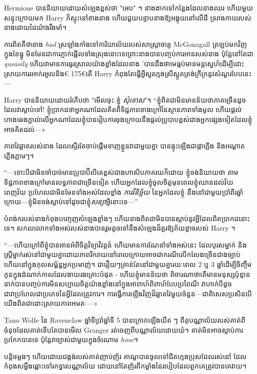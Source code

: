 {{{{{{{{Hermione បាននិយាយដោយសំឡេងខ្ពស់ថា "អេប" ។ នាងងាកទៅកន្លែងដែលនាងឈរ ហើយមួយសន្ទុះក្រោយមក Harry ក៏ស្ទុះទៅខាងនាង ហើយជួយបន្ទាបនាងឱ្យអង្គុយនៅលើដី ទ្ររាងកាយរបស់នាងដោយដៃយ៉ាងរឹងមាំ។

ការពិតគឺថានាង \emph{had} ស្រឡាំងកាំងទៅការិយាល័យរបស់សាស្រ្តាចារ្យ McGonagall ត្រឡប់មកវិញក្នុងខែធ្នូ មិនមែនជាការភ្ញាក់ផ្អើលទាំងស្រុងនោះទេព្រោះនាងបានបញ្ចប់ការអានរបស់នាង ប៉ុន្តែនៅតែជា \emph{queasily} ហើយវាមានការធូរស្រាលយ៉ាងខ្លាំងដែលនាង 'បានដឹងថាមេធ្មប់មានមន្តស្នេហ៍ដើម្បីដោះស្រាយការរអាក់រអួលនិង€ 175€{តើ Harry កំពុងតែធ្វើអ្វីសួរក្មេងស្រីស្លូតត្រង់ក្រីក្រនូវសំណួរបែបនេះ—}

Harry បាននិយាយដោយរំភើបថា "មើលចុះ ខ្ញុំ \emph{សុំទោស}"។ “ខ្ញុំ​ពិត​ជា​មិន​មាន​ន័យ​ថា​ភាគច្រើន​ដូច​ដែល​វា​ស្តាប់​ទៅ! ខ្ញុំ​ប្រាកដ​ថា​អ្នក​ណា​ដែល​គិត​ពី​ទិដ្ឋភាព​ខាងក្រៅ​នៃ​ស្ថានភាព​ទាំង​មូល ហើយ​ផ្តល់​ហាងឆេង​ភ្នាល់​លើ​អ្នក​ណា​ដែល​ខ្ញុំ​បាន​រៀបការ​ចុងក្រោយ​នឹង​ផ្តល់​ប្រូបាប​ខ្ពស់​ជាង​អ្នក​ផ្សេង​ទៀត​ដែល​ខ្ញុំ​អាច​គិត​ដល់—»

ភាពវៃឆ្លាតរបស់នាង ដែលស្ទើរតែចាប់ផ្តើមទាញខ្លួនវាជាមួយគ្នា បានផ្ទុះឡើងជាផ្កាភ្លើង និងអណ្តាតភ្លើងភ្លាមៗ។

“—ទោះបីជាមិនចាំបាច់មានប្រូបាប៊ីលីតេខ្ពស់ជាងហាសិបភាគរយក៏ដោយ ខ្ញុំចង់និយាយថា តាមទិដ្ឋភាពខាងក្រៅមានលទ្ធភាពជាច្រើនទៀត ហើយអ្នកដែលខ្ញុំចូលចិត្តមុនពេលខ្ញុំឈានដល់វ័យពេញវ័យ ប្រហែលជាមិនមែនទាំងអស់ដែលខ្លាំង \emph{ការវិនិច្ឆ័យ} នៃអ្នកដែលខ្ញុំ នឹងនៅជាមួយប្រាំពីរឆ្នាំក្រោយ—ខ្ញុំមិនចង់ស្តាប់ទៅដូចជាខ្ញុំ\emph{សន្យា}អ្វីនោះទេ—”

បំពង់ករបស់នាងកំពុងបញ្ចេញសំឡេងខ្លាំងៗ ហើយនាងពិតជាមិនបានស្តាប់នូវអ្វីដែលពិតប្រាកដនោះទេ។ សកលលោកទាំងអស់របស់នាងបានរួមតូចទៅនឹងសំឡេងដ៏គួរឱ្យភ័យខ្លាចរបស់ Harry ។

“—ហើយក្រៅពីខ្ញុំបានអានអំពីចិត្តវិទ្យាវិវត្តន៍ ហើយមានការណែនាំទាំងអស់នេះ ដែលបុរសម្នាក់ និងស្ត្រីម្នាក់រស់នៅជាមួយគ្នាដោយភាពរីករាយនៅពេលក្រោយអាចជាករណីលើកលែងច្រើនជាងច្បាប់ ហើយនៅក្នុងកុលសម្ព័ន្ធអ្នកប្រមាញ់។ ជារឿយៗគ្រាន់តែនៅជាមួយគ្នារយៈពេល 2 ឬ 3 ឆ្នាំដើម្បីចិញ្ចឹមកូនក្នុងដំណាក់កាលដែលងាយរងគ្រោះបំផុត - ហើយខ្ញុំមានន័យថា ពិចារណាថាតើមានមនុស្សប៉ុន្មាននាក់បានបញ្ចប់ការមិនសប្បាយចិត្តយ៉ាងខ្លាំងនៅក្នុងអាពាហ៍ពិពាហ៍បែបប្រពៃណី វាហាក់បីដូចជាវាប្រហែលជាប្រភេទនៃអ្វីដែលត្រូវការ។ ការ​ធ្វើ​ការ​ឡើង​វិញ​ដ៏​ឆ្លាត​វៃ​មួយ​ចំនួន—ជា​ពិសេស​ប្រសិន​បើ​យើង​ពិត​ជា​ដោះស្រាយ​ភាព​អមតៈ—»

\later

Tano Wolfe នៃ Ravenclaw ឆ្នាំទីប្រាំឆ្នាំទី 5 បានក្រោកឡើងយឺត ៗ ពីតុបណ្ណាល័យរបស់គាត់ពីចំនុចដែលគាត់ទើបតែបានមើល Granger រត់ចេញពីបណ្ណាល័យដោយយំ។ គាត់​មិន​អាច​ស្តាប់​ការ​ប្រកែក​បាន​ទេ ប៉ុន្តែ​វា​ច្បាស់​ជា​មួយ​ក្នុង​ចំណោម \emph{hose}។

បន្តិចម្ដងៗ ហើយដោយជង្គង់របស់គាត់ញាប់ញ័រ តាណូបានចូលទៅជិតក្មេងប្រុសដែលរស់នៅ ដែលកំពុងសម្លឹងឆ្ពោះទៅរកទ្វារបណ្ណាល័យ ដោយនៅតែញ័រពីកម្លាំងនៃរបៀបដែលពួកគេត្រូវបានគេវាយ។

}}}}}}}}
